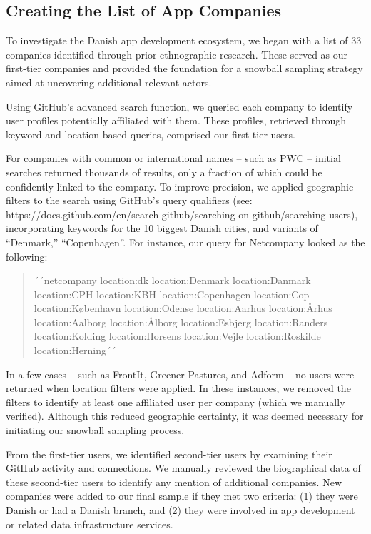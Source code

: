 \subsection{Creating the List of App Companies}

To investigate the Danish app development ecosystem, we began with a list of 33 companies identified through prior ethnographic research. These served as our first-tier companies and provided the foundation for a snowball sampling strategy aimed at uncovering additional relevant actors.

Using GitHub’s advanced search function, we queried each company to identify user profiles potentially affiliated with them. These profiles, retrieved through keyword and location-based queries, comprised our first-tier users.

For companies with common or international names -- such as PWC -- initial searches returned thousands of results, only a fraction of which could be confidently linked to the company. To improve precision, we applied geographic filters to the search using GitHub’s query qualifiers (see: https://docs.github.com/en/search-github/searching-on-github/searching-users), incorporating keywords for the 10 biggest Danish cities, and variants of “Denmark,” “Copenhagen”. For instance, our query for Netcompany looked as the following:

\begin{quote}
\ttfamily\small
´´netcompany location:dk location:Denmark location:Danmark location:CPH location:KBH location:Copenhagen location:Cop location:København location:Odense location:Aarhus location:Århus location:Aalborg location:Ålborg location:Esbjerg location:Randers location:Kolding location:Horsens location:Vejle location:Roskilde location:Herning´´
\end{quote}

In a few cases -- such as FrontIt, Greener Pastures, and Adform -- no users were returned when location filters were applied. In these instances, we removed the filters to identify at least one affiliated user per company (which we manually verified). Although this reduced geographic certainty, it was deemed necessary for initiating our snowball sampling process.

From the first-tier users, we identified second-tier users by examining their GitHub activity and connections. We manually reviewed the biographical data of these second-tier users to identify any mention of additional companies. New companies were added to our final sample if they met two criteria: (1) they were Danish or had a Danish branch, and (2) they were involved in app development or related data infrastructure services.

